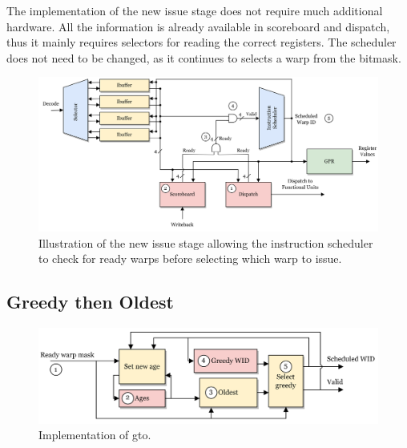 The implementation of the new issue stage does not require much additional hardware. All the information is already available in scoreboard and dispatch, thus it mainly requires selectors for reading the correct registers. The scheduler does not need to be changed, as it continues to selects a warp from the bitmask. 

\begin{figure}
    \centering
    \includegraphics[width=\textwidth]{figures/New Issue Stage.png}
    \caption[Illustration of the new issue stage.]{Illustration of the new issue stage allowing the instruction scheduler to check for ready warps before selecting which warp to issue.}
    \label{fig:new_issue_stage}
\end{figure}


\subsection{Greedy then Oldest}

\begin{figure}
    \centering
    \includegraphics[width=\textwidth]{figures/gto_numbers.png}
    \caption{Implementation of \acrfull{gto}.}
    \label{fig:gto_impl}
\end{figure}

